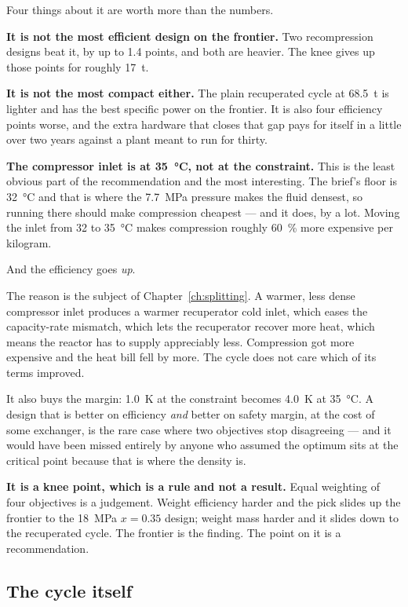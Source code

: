 \documentclass[11pt,a4paper]{report}
\begin{document}
Four things about it are worth more than the numbers.

\textbf{It is not the most efficient design on the frontier.} Two
recompression designs beat it, by up to \num{1.4} points, and both are
heavier. The knee gives up those points for roughly \SI{17}{\tonne}.

\textbf{It is not the most compact either.} The plain recuperated cycle at
\SI{68.5}{\tonne} is lighter and has the best specific power on the
frontier. It is also four efficiency points worse, and the extra hardware
that closes that gap pays for itself in a little over two years against a
plant meant to run for thirty.

\textbf{The compressor inlet is at \SI{35}{\celsius}, not at the
constraint.} This is the least obvious part of the recommendation and the
most interesting. The brief's floor is \SI{32}{\celsius} and that is where
the \SI{7.7}{\mega\pascal} pressure makes the fluid densest, so running
there should make compression cheapest --- and it does, by a lot. Moving the
inlet from \num{32} to \SI{35}{\celsius} makes compression roughly
\SI{60}{\percent} more expensive per kilogram.

And the efficiency goes \emph{up}.

The reason is the subject of Chapter~\ref{ch:splitting}. A warmer, less
dense compressor inlet produces a warmer recuperator cold inlet, which eases
the capacity-rate mismatch, which lets the recuperator recover more heat,
which means the reactor has to supply appreciably less. Compression got more
expensive and the heat bill fell by more. The cycle does not care which of
its terms improved.

It also buys the margin: \SI{1.0}{\kelvin} at the constraint becomes
\SI{4.0}{\kelvin} at \SI{35}{\celsius}. A design that is better on
efficiency \emph{and} better on safety margin, at the cost of some exchanger,
is the rare case where two objectives stop disagreeing --- and it would have
been missed entirely by anyone who assumed the optimum sits at the critical
point because that is where the density is.

\textbf{It is a knee point, which is a rule and not a result.} Equal
weighting of four objectives is a judgement. Weight efficiency harder and
the pick slides up the frontier to the \SI{18}{\mega\pascal}
$x = 0.35$ design; weight mass harder and it slides down to the recuperated
cycle. The frontier is the finding. The point on it is a recommendation.

\subsection{The cycle itself}
\end{document}
